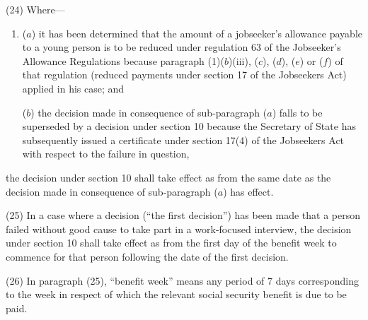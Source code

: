 \documentclass[12pt,a4paper]{article}
\begin{document}
(24) Where—
\begin{enumerate}\item[]
($a$) it has been determined that the amount of a jobseeker’s allowance payable to a young person is to be reduced under regulation 63 of the Jobseeker’s Allowance Regulations because paragraph (1)($b$)(iii), ($c$), ($d$), ($e$) or ($f$) of that regulation (reduced payments under section 17 of the Jobseekers Act) applied in his case; and

($b$) the decision made in consequence of sub-paragraph ($a$) falls to be superseded by a decision under section 10 because the Secretary of State has subsequently issued a certificate under section 17(4) of the Jobseekers Act with respect to the failure in question,
\end{enumerate}
the decision under section 10 shall take effect as from the same date as the decision made in consequence of sub-paragraph ($a$) has effect.

(25) In a case where a decision (“the first decision”) has been made that a person failed without good cause to take part in a work-focused interview, the decision under section 10 shall take effect as from the first day of the benefit week to commence for that person following the date of the first decision.

(26) In paragraph (25), “benefit week” means any period of 7 days corresponding to the week in respect of which the relevant social security benefit is due to be paid.
\end{document}
